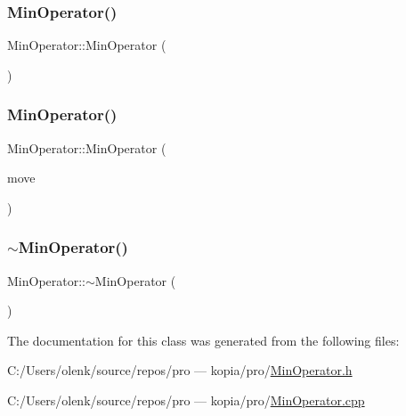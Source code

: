 \subsubsection{\texorpdfstring{MinOperator()}{MinOperator()}\hspace{0.1cm}{\footnotesize\ttfamily [1/2]}}
{\footnotesize\ttfamily Min\+Operator\+::\+Min\+Operator (\begin{DoxyParamCaption}{ }\end{DoxyParamCaption})}

\mbox{\label{class_min_operator_ab4a571ca005e5dc41a952a6a0bbf22a5}} 
\subsubsection{\texorpdfstring{MinOperator()}{MinOperator()}\hspace{0.1cm}{\footnotesize\ttfamily [2/2]}}
{\footnotesize\ttfamily Min\+Operator\+::\+Min\+Operator (\begin{DoxyParamCaption}\item[{\mbox{\hyperlink{class_min_operator}{Min\+Operator}} \&\&}]{move }\end{DoxyParamCaption})}

\mbox{\label{class_min_operator_a8e4a21d4ff6ae49893bb717a18c1c1ac}} 
\subsubsection{\texorpdfstring{$\sim$MinOperator()}{~MinOperator()}}
{\footnotesize\ttfamily Min\+Operator\+::$\sim$\+Min\+Operator (\begin{DoxyParamCaption}{ }\end{DoxyParamCaption})}



The documentation for this class was generated from the following files\+:\begin{DoxyCompactItemize}
\item 
C\+:/\+Users/olenk/source/repos/pro — kopia/pro/\mbox{\hyperlink{_min_operator_8h}{Min\+Operator.\+h}}\item 
C\+:/\+Users/olenk/source/repos/pro — kopia/pro/\mbox{\hyperlink{_min_operator_8cpp}{Min\+Operator.\+cpp}}\end{DoxyCompactItemize}
